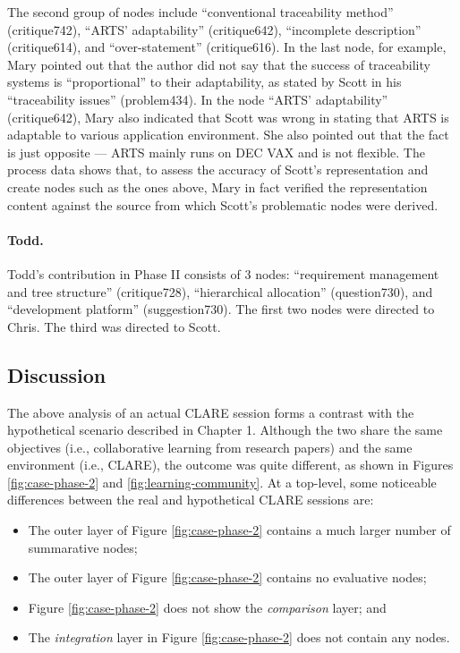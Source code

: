 The second group of  nodes include ``conventional
traceability method'' (critique742), ``ARTS' adaptability'' (critique642),
``incomplete description'' (critique614), and ``over-statement''
(critique616). In the last node, for example, Mary pointed out that the
author did not say that the success of traceability systems is
``proportional'' to their adaptability, as stated by Scott in his
``traceability issues'' (problem434). In the node ``ARTS' adaptability''
(critique642), Mary also indicated that Scott was wrong in stating that
ARTS is adaptable to various application environment. She also pointed out
that the fact is just opposite --- ARTS mainly runs on DEC VAX and is not
flexible. The process data shows that, to assess the accuracy of Scott's
representation and create  nodes such as the ones
above, Mary in fact verified the representation content against the source
from which Scott's problematic nodes were derived.


\paragraph{Todd.}

Todd's contribution in Phase II consists of 3 nodes: ``requirement
management and tree structure'' (critique728), ``hierarchical allocation''
(question730), and ``development platform'' (suggestion730). The first two
nodes were directed to Chris. The third was directed to Scott.



\subsection{Discussion}

The above analysis of an actual CLARE session forms a contrast with the
hypothetical scenario described in Chapter 1. Although the two share the
same objectives (i.e., collaborative learning from research papers) and the
same environment (i.e., CLARE), the outcome was quite different, as
shown in Figures \ref{fig:case-phase-2} and \ref{fig:learning-community}.
At a top-level, some noticeable differences between the real and
hypothetical CLARE sessions are:

\begin{itemize}
\item The outer layer of Figure \ref{fig:case-phase-2} contains a much
  larger number of summarative nodes;
  
\item The outer layer of Figure \ref{fig:case-phase-2} contains no
  evaluative nodes;
  
\item Figure \ref{fig:case-phase-2} does not show the {\it comparison\/}
  layer; and
  
\item The {\it integration\/} layer in Figure \ref{fig:case-phase-2} does
  not contain any nodes.
\end{itemize}

